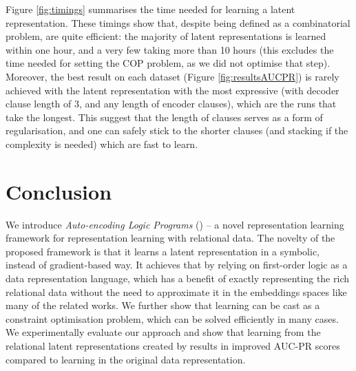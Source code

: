 Figure \ref{fig:timings} summarises the time needed for learning a  latent representation.
These timings show that, despite being defined as a combinatorial problem,  are quite efficient: the majority of latent representations is learned within one hour, and a very few taking more than 10 hours (this excludes the time needed for setting the COP problem, as we did not optimise that step).
Moreover, the best result on each dataset (Figure \ref{fig:resultsAUCPR}) is rarely achieved with the latent representation with the most expressive \alp{} (with decoder clause length of 3, and any length of encoder clauses), which are the runs that take the longest.
This suggest that the length of clauses serves as a form of regularisation, and one can safely stick to the shorter clauses (and stacking if the complexity is needed) which are fast to learn.









\section{Conclusion}


We introduce \textit{Auto-encoding Logic Programs} () -- a novel representation learning framework for representation learning with relational data.
The novelty of the proposed framework is that it learns a latent representation in a symbolic, instead of gradient-based way.
It achieves that by relying on first-order logic as a data representation language, which has a benefit of exactly representing the rich relational data without the need to approximate it in the embeddings spaces like many of the related works.
We further show that learning  can be cast as a constraint optimisation problem, which can be solved efficiently in many cases.
We experimentally evaluate our approach and show that learning from the relational latent representations created by  results in improved AUC-PR scores compared to learning in the original data representation.


\cleardoublepage

